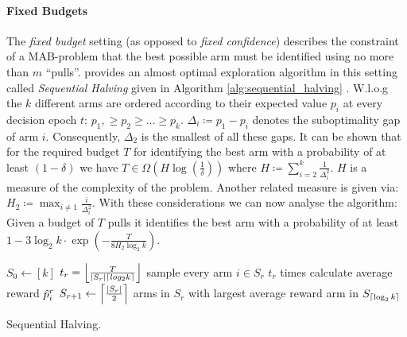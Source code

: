 \paragraph{Fixed Budgets}
The \textit{fixed budget} setting (as opposed to \textit{fixed confidence}) describes the constraint of a MAB-problem that the best possible arm must be identified using no more than $m$ \enquote{pulls}.
\cite{karnin2013almost} provides an almost optimal exploration algorithm in this setting called \textit{Sequential Halving} given in Algorithm \ref{alg:sequential_halving} . W.l.o.g the $k$ different arms are ordered according to their expected value $p_i$ at every decision epoch $t$: $p_1, \geq p_2 \geq \ldots \geq p_k$. $\Delta_i \coloneqq p_1 - p_i$ denotes the suboptimality gap of arm $i$. Consequently, $\Delta_2$ is the smallest of all these gaps. It can be shown that for the required budget $T$ for identifying the best arm with a probability of at least $(1-\delta)$ we have $T \in \Omega(H \log (\frac{1}{\delta}))$ where $H \coloneqq \sum_{i=2}^{k} \frac{1}{\Delta_i^2}$. $H$ is a measure of the complexity of the problem. Another related measure is given via: $H_2 \coloneqq \max_{i \neq 1} \frac{i}{\Delta_i^2}$. With these considerations we can now analyse the algorithm: Given a budget of $T$ pulls it identifies the best arm with a probability of at least $1-3 \log_2 k \cdot \exp \left(-\frac{T}{8H_2 \log_2 k}\right)$. 

\begin{algorithm}[htbp]
\begin{algorithmic}
    \State $S_0 \gets [k]$
    \State $t_r = \floor*{\frac{T}{\left|S_r\right| \ceil*{log_2 k}}}$
    \State sample every arm $i \in S_r$ $t_r$ times
    \State calculate average reward $\Hat{p}_i^r$
    \State $S_{r+1} \gets \ceil*{\frac{\left| S_r \right|}{2}}$ arms in $S_r$ with largest average reward
    \EndFor
    \State \Return arm in $S_{\ceil*{\log_2 k}}$
\EndFunction
\end{algorithmic}
\caption{Sequential Halving.}
\label{alg:sequential_halving}
\end{algorithm}

